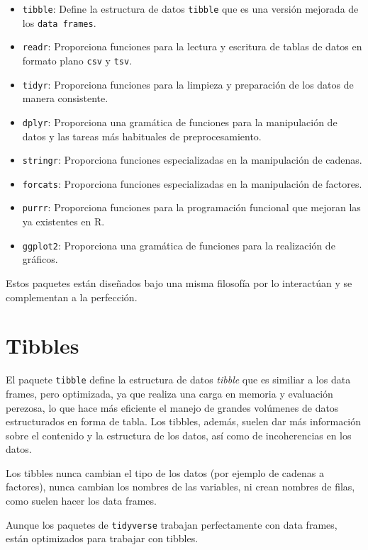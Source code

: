\documentclass[
  spanish,
  a4paper,
]{scrreport}
\providecommand{\tightlist}{%
  \setlength{\itemsep}{0pt}\setlength{\parskip}{0pt}}
\theoremstyle{definition}
\theoremstyle{definition}
\theoremstyle{remark}
\begin{document}
\begin{itemize}
\tightlist
\item
  \texttt{tibble}: Define la estructura de datos \texttt{tibble} que es
  una versión mejorada de los \texttt{data\ frames}.
\item
  \texttt{readr}: Proporciona funciones para la lectura y escritura de
  tablas de datos en formato plano \texttt{csv} y \texttt{tsv}.
\item
  \texttt{tidyr}: Proporciona funciones para la limpieza y preparación
  de los datos de manera consistente.
\item
  \texttt{dplyr}: Proporciona una gramática de funciones para la
  manipulación de datos y las tareas más habituales de preprocesamiento.
\item
  \texttt{stringr}: Proporciona funciones especializadas en la
  manipulación de cadenas.
\item
  \texttt{forcats}: Proporciona funciones especializadas en la
  manipulación de factores.
\item
  \texttt{purrr}: Proporciona funciones para la programación funcional
  que mejoran las ya existentes en R.
\item
  \texttt{ggplot2}: Proporciona una gramática de funciones para la
  realización de gráficos.
\end{itemize}

Estos paquetes están diseñados bajo una misma filosofía por lo
interactúan y se complementan a la perfección.

\section{Tibbles}\label{tibbles}

El paquete \texttt{tibble} define la estructura de datos \emph{tibble}
que es similiar a los data frames, pero optimizada, ya que realiza una
carga en memoria y evaluación perezosa, lo que hace más eficiente el
manejo de grandes volúmenes de datos estructurados en forma de tabla.
Los tibbles, además, suelen dar más información sobre el contenido y la
estructura de los datos, así como de incoherencias en los datos.

Los tibbles nunca cambian el tipo de los datos (por ejemplo de cadenas a
factores), nunca cambian los nombres de las variables, ni crean nombres
de filas, como suelen hacer los data frames.

Aunque los paquetes de \texttt{tidyverse} trabajan perfectamente con
data frames, están optimizados para trabajar con tibbles.
\end{document}
